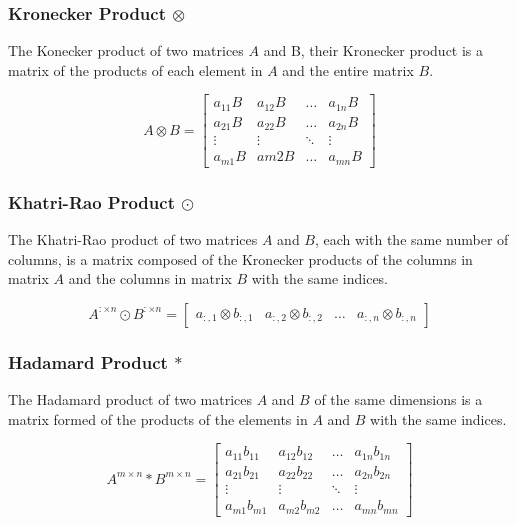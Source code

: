 \documentclass{article}
\begin{document}

\subsubsection{Kronecker Product \(\otimes\)}

The Konecker product of two matrices \(A\) and B, their Kronecker product is a matrix of the products of each element in \(A\) and the entire matrix \(B\).

\begin{equation}
    A \otimes B = \begin{bmatrix}
    a_{11}B & a_{12}B & \dots & a_{1n}B \\
    a_{21}B & a_{22}B & \dots & a_{2n}B \\
    \vdots & \vdots & \ddots & \vdots \\
    a_{m1}B & a{m2}B & \dots & a_{mn}B \end{bmatrix}
    \label{Kronecker} 
\end{equation}

\subsubsection{Khatri-Rao Product \(\odot\)}

The Khatri-Rao product of two matrices \(A\) and \(B\), each with the same number of columns, is a matrix composed of the Kronecker products of the columns in matrix \(A\) and the columns in matrix \(B\) with the same indices.

\begin{equation}
    A^{:\times n} \odot B^{:\times n} = \begin{bmatrix}
    a_{:,1} \otimes b_{:,1} & a_{:,2} \otimes b_{:,2} & \dots & a_{:,n} \otimes b_{:,n} \end{bmatrix}
    \label{Khatri-Rao}
\end{equation}

\subsubsection{Hadamard Product \(*\)}

The Hadamard product of two matrices \(A\) and \(B\) of the same dimensions is a matrix formed of the products of the elements in \(A\) and \(B\) with the same indices.

\begin{equation}
    A^{m \times n} * B^{m \times n} = \begin{bmatrix}
    a_{11}b_{11} & a_{12}b_{12} & \dots & a_{1n}b_{1n} \\
    a_{21}b_{21} & a_{22}b_{22} & \dots & a_{2n}b_{2n} \\
    \vdots & \vdots & \ddots & \vdots \\
    a_{m1}b_{m1} & a_{m2}b_{m2} & \dots & a_{mn}b_{mn} \end{bmatrix} 
    \label{Hadamard}
\end{equation}
\end{document}
